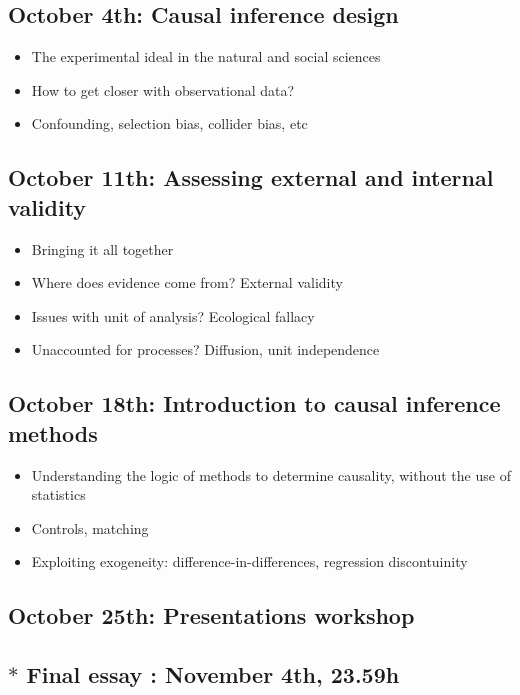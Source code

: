 \documentclass[12pt, a4paper]{article}
\begin{document}
\subsection*{October 4th: Causal inference design}

\begin{itemize}
\setlength\itemsep{-5pt}
  \item The experimental ideal in the natural and social sciences
  \item How to get closer with observational data?
  \item Confounding, selection bias, collider bias, etc
\end{itemize}

\subsection*{October 11th: Assessing external and internal validity}

\begin{itemize}
\setlength\itemsep{-5pt}
  \item Bringing it all together
  \item Where does evidence come from? External validity
  \item Issues with unit of analysis? Ecological fallacy
  \item Unaccounted for processes? Diffusion, unit independence
\end{itemize}

\subsection*{October 18th: Introduction to causal inference methods}

\begin{itemize}
\setlength\itemsep{-5pt}
  \item Understanding the logic of methods to determine causality, without the use of statistics
  \item Controls, matching
  \item Exploiting exogeneity: difference-in-differences, regression discontuinity
\end{itemize}

\subsection*{October 25th: Presentations workshop}

\subsection*{$*$ Final essay {\color{red}{deadline}}: November 4th, 23.59h}
\end{document}
